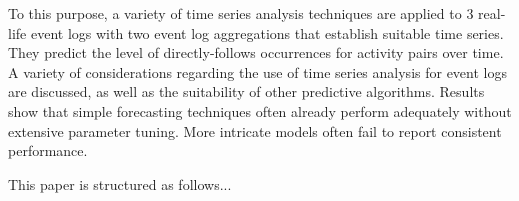 To this purpose, a variety of time series analysis techniques are applied to 3 real-life event logs with two event log aggregations that establish suitable time series. They predict the level of directly-follows occurrences for activity pairs over time.
A variety of considerations regarding the use of time series analysis for event logs are discussed, as well as the suitability of other predictive algorithms.
Results show that simple forecasting techniques often already perform adequately without extensive parameter tuning. More intricate models often fail to report consistent performance.

This paper is structured as follows...